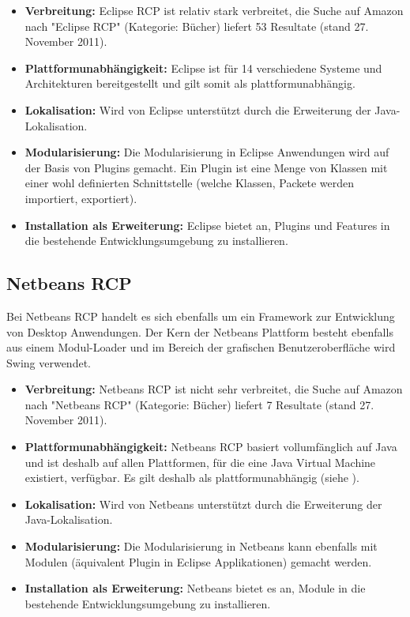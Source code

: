 \begin{itemize}
\item \textbf{Verbreitung:} Eclipse RCP ist relativ stark verbreitet, die Suche auf Amazon nach "Eclipse RCP" (Kategorie: Bücher) liefert 53 Resultate (stand 27. November 2011).
\item \textbf{Plattformunabhängigkeit:} Eclipse ist für 14 verschiedene Systeme und Architekturen bereitgestellt und gilt somit als plattformunabhängig\cite{wiki:eclipse}.
\item \textbf{Lokalisation:} Wird von Eclipse unterstützt durch die Erweiterung der Java-Lokalisation.
\item \textbf{Modularisierung:} Die Modularisierung in Eclipse Anwendungen wird auf der Basis von Plugins gemacht. Ein Plugin ist eine Menge von Klassen mit einer wohl definierten Schnittstelle (welche Klassen, Packete werden importiert, exportiert).
\item \textbf{Installation als Erweiterung:} Eclipse bietet an, Plugins und Features in die bestehende Entwicklungsumgebung zu installieren.
\end{itemize}

\subsection{Netbeans RCP}
Bei Netbeans RCP handelt es sich ebenfalls um ein Framework zur Entwicklung von Desktop Anwendungen. Der Kern der Netbeans Plattform besteht ebenfalls aus einem Modul-Loader und im Bereich der grafischen Benutzeroberfläche wird Swing verwendet. 
\begin{itemize}
\item \textbf{Verbreitung:} Netbeans RCP ist nicht sehr verbreitet, die Suche auf Amazon nach "Netbeans RCP" (Kategorie: Bücher) liefert 7 Resultate (stand 27. November 2011).
\item \textbf{Plattformunabhängigkeit:} Netbeans RCP basiert vollumfänglich auf Java und ist deshalb auf allen Plattformen, für die eine Java Virtual Machine existiert, verfügbar. Es gilt deshalb als plattformunabhängig (siehe \cite{wiki:netbeans}).
\item \textbf{Lokalisation:} Wird von Netbeans unterstützt durch die Erweiterung der Java-Lokalisation.
\item \textbf{Modularisierung:} Die Modularisierung in Netbeans kann ebenfalls mit Modulen (äquivalent Plugin in Eclipse Applikationen) gemacht werden.
\item \textbf{Installation als Erweiterung:} Netbeans bietet es an, Module in die bestehende Entwicklungsumgebung zu installieren.
\end{itemize}

